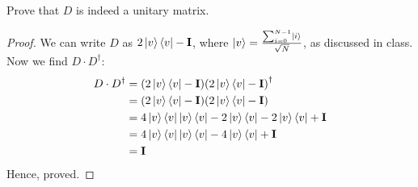 \begin{solution}[label=ques:2a]
  \begin{question}
    Prove that $D$ is indeed a unitary matrix.
  \end{question}
  \tcblower{}
  \begin{proof}[Proof]
    We can write $D$ as $2\ket{v}\bra{v} - \mathbf{I}$, where $\ket{v} = \frac{\sum_{i=0}^{N-1}\ket{i}}{\sqrt{N}}$, as discussed in class. Now we find $D\cdot D^\dagger$:
    \begin{equation}
      \begin{split}
        D\cdot D^\dagger &= (2\ket{v}\bra{v} - \mathbf{I}){(2\ket{v}\bra{v} - \mathbf{I})}^\dagger\\
        &= (2\ket{v}\bra{v} - \mathbf{I})(2\ket{v}\bra{v} - \mathbf{I})\\
        &= 4\ket{v}\bra{v}\ket{v}\bra{v} - 2\ket{v}\bra{v} - 2\ket{v}\bra{v} + \mathbf{I}\\
        &= 4\ket{v}\bra{v}\ket{v}\bra{v} - 4\ket{v}\bra{v} + \mathbf{I}\\
        &= \mathbf{I}
      \end{split}
      \label{eq:unitdiffusion}
    \end{equation}
    Hence, proved.
  \end{proof}
\end{solution}

